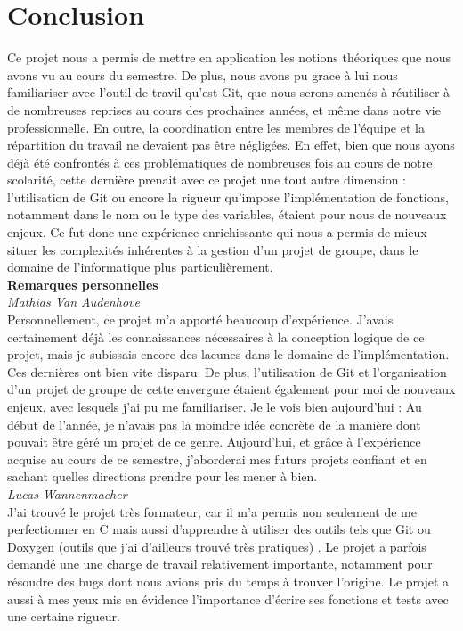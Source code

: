 \section{Conclusion}

Ce projet nous a permis de mettre en application les notions théoriques que nous avons vu au cours du semestre. De plus, nous avons pu grace à lui nous familiariser avec l'outil de travil qu'est Git, que nous serons amenés à réutiliser à de nombreuses reprises au cours des prochaines années, et même dans notre vie professionnelle. En outre, la coordination entre les membres de l'équipe et la répartition du travail ne devaient pas être négligées. En effet, bien que nous ayons déjà été confrontés à ces problématiques de nombreuses fois au cours de notre scolarité, cette dernière prenait avec ce projet une tout autre dimension : l'utilisation de Git ou encore la rigueur qu'impose l'implémentation de fonctions, notamment dans le nom ou le type des variables, étaient pour nous de nouveaux enjeux. Ce fut donc une expérience enrichissante qui nous a permis de mieux situer les complexités inhérentes à la gestion d'un projet de groupe, dans le domaine de l'informatique plus particulièrement.\\

\textbf{Remarques personnelles}\\

\textit{Mathias Van Audenhove}\\

Personnellement, ce projet m'a apporté beaucoup d’expérience. J'avais certainement déjà les connaissances nécessaires à la conception logique de ce projet, mais je subissais encore des lacunes dans le domaine de l'implémentation. Ces dernières ont bien vite disparu. De plus, l'utilisation de Git et l'organisation d'un projet de groupe de cette envergure étaient également pour moi de nouveaux enjeux, avec lesquels j'ai pu me familiariser. Je le vois bien aujourd'hui : Au début de l'année, je n'avais pas la moindre idée concrète de la manière dont pouvait être géré un projet de ce genre. Aujourd'hui, et grâce à l'expérience acquise au cours de ce semestre, j'aborderai mes futurs projets confiant et en sachant quelles directions prendre pour les mener à bien.\\

\textit{Lucas Wannenmacher}\\

J'ai trouvé le projet très formateur, car il m'a permis non seulement de me perfectionner en C mais aussi d'apprendre à utiliser des outils tels que Git ou Doxygen (outils que j'ai d'ailleurs trouvé très pratiques) . Le projet a parfois demandé une une charge de travail relativement importante, notamment pour résoudre des bugs dont nous avions pris du temps à trouver l'origine. Le projet a aussi à mes yeux mis en évidence l'importance d'écrire ses fonctions et tests avec une certaine rigueur.\\

